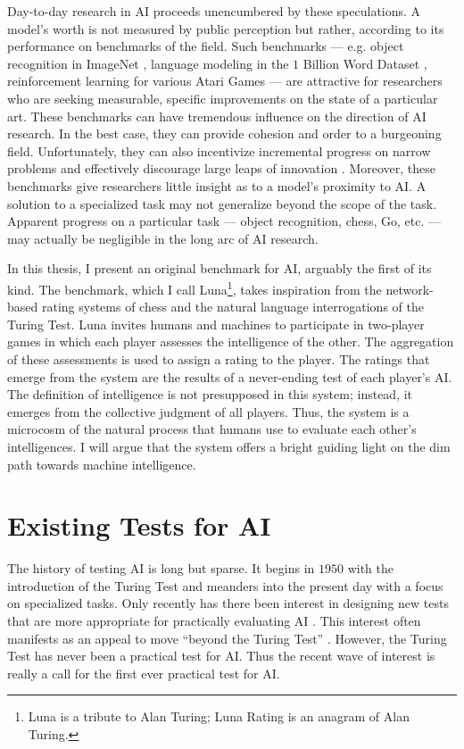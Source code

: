Day-to-day research in AI proceeds unencumbered by these speculations. A model's worth is not measured by public perception but rather, according to its performance on benchmarks of the field. Such benchmarks --- e.g. object recognition in ImageNet \citep{russakovsky2015imagenet}, language modeling in the $1$ Billion Word Dataset \citep{chelba2013one}, reinforcement learning for various Atari Games \citep{mnih2013playing} --- are attractive for researchers who are seeking measurable, specific improvements on the state of a particular art. These benchmarks can have tremendous influence on the direction of AI research. In the best case, they can provide cohesion and order to a burgeoning field. Unfortunately, they can also incentivize incremental progress on narrow problems and effectively discourage large leaps of innovation \citep{shieber2015}. Moreover, these benchmarks give researchers little insight as to a model's proximity to AI. A solution to a specialized task may not generalize beyond the scope of the task. Apparent progress on a particular task --- object recognition, chess, Go, etc. --- may actually be negligible in the long arc of AI research.

In this thesis, I present an original benchmark for AI, arguably the first of its kind. The benchmark, which I call Luna\footnote{Luna is a tribute to Alan Turing; Luna Rating is an anagram of Alan Turing.}, takes inspiration from the network-based rating systems of chess and the natural language interrogations of the Turing Test. Luna invites humans and machines to participate in two-player games in which each player assesses the intelligence of the other. The aggregation of these assessments is used to assign a rating to the player. The ratings that emerge from the system are the results of a never-ending test of each player's AI. The definition of intelligence is not presupposed in this system; instead, it emerges from the collective judgment of all players. Thus, the system is a microcosm of the natural process that humans use to evaluate each other's intelligences. I will argue that the system offers a bright guiding light on the dim path towards machine intelligence.

\section{Existing Tests for AI}

The history of testing AI is long but sparse. It begins in $1950$ with the introduction of the Turing Test and meanders into the present day with a focus on specialized tasks. Only recently has there been interest in designing new tests that are more appropriate for practically evaluating AI \citep{you2015beyond}. This interest often manifests as an appeal to move ``beyond the Turing Test'' \citep{1_the_newyorker_2015}. However, the Turing Test has never been a practical test for AI. Thus the recent wave of interest is really a call for the first ever practical test for AI.

